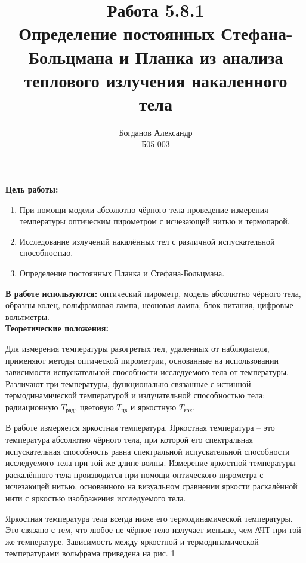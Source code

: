 \documentclass[a4paper, 12pt]{article}%
\author{Богданов Александр \\
	Б05-003}
\title{\textbf{Работа 5.8.1 \\ 
		Определение постоянных Стефана-Больцмана и Планка из анализа теплового излучения накаленного тела}}
\begin{document}
\maketitle

\textbf{Цель работы:} 

\begin{enumerate}

    \item При помощи модели абсолютно чёрного тела проведение измерения температуры оптическим пирометром с исчезающей нитью и термопарой.
    
    \item Исследование излучений накалённых тел с различной испускательной способностью.
    
    \item Определение постоянных Планка и Стефана-Больцмана.
    
\end{enumerate}

\textbf{В работе используются:} оптический пирометр,  модель абсолютно чёрного тела,  образцы колец,  вольфрамовая лампа,  неоновая лампа,  блок питания,  цифровые вольтметры.\\

\textbf{Теоретические положения:}\\\par

Для измерения температуры разогретых тел, удаленных от наблюдателя, применяют методы оптической пирометрии, основанные на использовании зависимости испускательной способности исследуемого тела от температуры. Различают три температуры, функционально связанные с истинной термодинамической температурой и излучательной способностью тела: радиационную $T_{\text{рад}}$,  цветовую $T_{\text{цв}}$ и яркостную $T_{\text{ярк}}$. \par

В работе измеряется яркостная температура.  Яркостная температура -- это температура абсолютно чёрного тела,  при которой его спектральная испускательная способность равна спектральной испускательной способности исследуемого тела при той же длине волны.  Измерение яркостной температуры раскалённого тела производится при помощи оптического пирометра с исчезающей нитью, основанного на визуальном сравнении яркости раскалённой нити с яркостью изображения исследуемого тела. \par

Яркостная температура тела всегда ниже его термодинамической температуры.  Это связано с тем,  что любое не чёрное тело излучает меньше, чем АЧТ при той же температуре.  Зависимость между яркостной и термодинамической температурами вольфрама приведена на рис. 1
\end{document}
